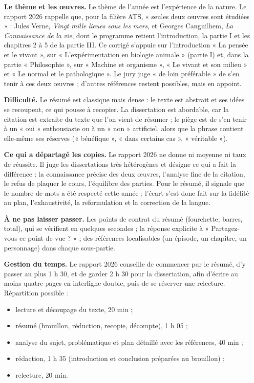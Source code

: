 \documentclass[11pt,a4paper]{article}
\providecommand{\tightlist}{\setlength{\itemsep}{0pt}\setlength{\parskip}{0pt}}
\begin{document}
\textbf{Le thème et les œuvres.} Le thème de l'année est l'expérience de la nature. Le rapport 2026 rappelle que, pour la filière ATS, « seules deux œuvres sont étudiées » : Jules Verne, \emph{Vingt mille lieues sous les mers}, et Georges Canguilhem, \emph{La Connaissance de la vie}, dont le programme retient l'introduction, la partie I et les chapitres 2 à 5 de la partie III. Ce corrigé s'appuie sur l'introduction « La pensée et le vivant », sur « L'expérimentation en biologie animale » (partie I) et, dans la partie « Philosophie », sur « Machine et organisme », « Le vivant et son milieu » et « Le normal et le pathologique ». Le jury juge « de loin préférable » de s'en tenir à ces deux œuvres ; d'autres références restent possibles, mais en appoint.

\textbf{Difficulté.} Le résumé est classique mais dense : le texte est abstrait et ses idées se recoupent, ce qui pousse à recopier. La dissertation est abordable, car la citation est extraite du texte que l'on vient de résumer ; le piège est de s'en tenir à un « oui » enthousiaste ou à un « non » artificiel, alors que la phrase contient elle-même ses réserves (« bénéfique », « dans certains cas », « véritable »).

\textbf{Ce qui a départagé les copies.} Le rapport 2026 ne donne ni moyenne ni taux de réussite. Il juge les dissertations très hétérogènes et désigne ce qui a fait la différence : la connaissance précise des deux œuvres, l'analyse fine de la citation, le refus de plaquer le cours, l'équilibre des parties. Pour le résumé, il signale que le nombre de mots a été respecté cette année ; l'écart s'est donc fait sur la fidélité au plan, l'exhaustivité, la reformulation et la correction de la langue.

\textbf{À ne pas laisser passer.} Les points de contrat du résumé (fourchette, barres, total), qui se vérifient en quelques secondes ; la réponse explicite à « Partagez-vous ce point de vue ? » ; des références localisables (un épisode, un chapitre, un personnage) dans chaque sous-partie.

\textbf{Gestion du temps.} Le rapport 2026 conseille de commencer par le résumé, d'y passer au plus 1 h 30, et de garder 2 h 30 pour la dissertation, afin d'écrire au moins quatre pages en interligne double, puis de se réserver une relecture. Répartition possible :

\begin{itemize}
\tightlist
\item
  lecture et découpage du texte, 20 min ;
\item
  résumé (brouillon, réduction, recopie, décompte), 1 h 05 ;
\item
  analyse du sujet, problématique et plan détaillé avec les références, 40 min ;
\item
  rédaction, 1 h 35 (introduction et conclusion préparées au brouillon) ;
\item
  relecture, 20 min.
\end{itemize}
\end{document}
